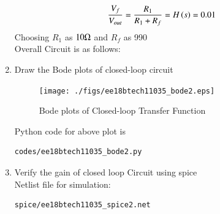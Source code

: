 \begin{enumerate}[label=\thesubsection.\arabic*.,ref=\thesubsection.\theenumi]
\begin{align}
    \frac{V_{f}}{V_{out}}=\frac{R_{1}}{R_{1}+R_{f}}=H\left(s\right)=0.01
\end{align}
Choosing $R_{1}$ as $10\ohm$ and $R_{f}$ as 990\ohm\\

Overall Circuit is as follows:
\begin{figure}[!ht]
    \begin{center}
		\resizebox{\columnwidth}{!}{}
	\end{center}
\caption{}
\label{fig:ee18btech11035_circuit}
\end{figure}


\begin{table}[!ht]
\centering

\caption{}
\label{table:ee18btech11035_table1}
\end{table}


\item Draw the Bode plots of closed-loop circuit\\
\solution
\begin{figure}[!h]
  \texttt{[image: ./figs/ee18btech11035\_bode2.eps]}
  \caption{Bode plots of Closed-loop Transfer Function}
  \label{fig:ee18btech11035_bode2}
\end{figure}

Python code for above plot is
\begin{lstlisting}
codes/ee18btech11035_bode2.py
\end{lstlisting}



\item Verify the gain of closed loop Circuit using spice\\
\solution Netlist file for simulation:
\begin{lstlisting}
spice/ee18btech11035_spice2.net
\end{lstlisting}


\end{enumerate}
